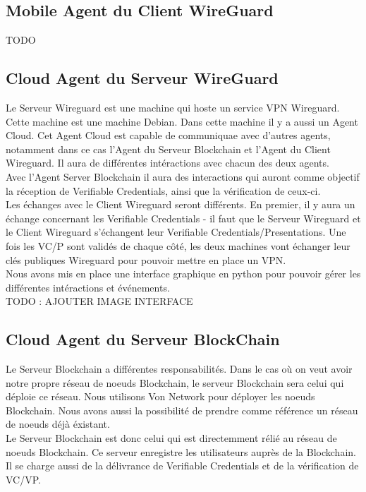 \documentclass[12pt, openany]{report}
\begin{document}
\subsection{Mobile Agent du Client WireGuard}
\noindent 
\begin{flushleft}
TODO
\end{flushleft}

\subsection{Cloud Agent du Serveur WireGuard}
\noindent 
\begin{flushleft}
Le Serveur Wireguard est une machine qui hoste un service VPN Wireguard. Cette machine est une machine Debian. Dans cette machine il y a aussi un Agent Cloud. Cet Agent Cloud est capable de communiquae avec d'autres agents, notamment dans ce cas l'Agent du Serveur Blockchain et l'Agent du Client Wireguard. Il aura de différentes intéractions avec chacun des deux agents. \\
Avec l'Agent Server Blockchain il aura des interactions qui auront comme objectif la réception de Verifiable Credentials, ainsi que la vérification de ceux-ci. \\
Les échanges avec le Client Wireguard seront différents. En premier, il y aura un échange concernant les Verifiable Credentials - il faut que le Serveur Wireguard et le Client Wireguard s'échangent leur Verifiable Credentials/Presentations. Une fois les VC/P sont validés de chaque côté, les deux machines vont échanger leur clés publiques Wireguard pour pouvoir mettre en place un VPN. \\
Nous avons mis en place une interface graphique en python pour pouvoir gérer les différentes intéractions et événements.\\
TODO : AJOUTER IMAGE INTERFACE 
\end{flushleft}

\subsection{Cloud Agent du Serveur BlockChain}
\noindent 
\begin{flushleft}
Le Serveur Blockchain a différentes responsabilités. Dans le cas où on veut avoir notre propre réseau de noeuds Blockchain, le serveur Blockchain sera celui qui déploie ce réseau. Nous utilisons Von Network pour déployer les noeuds Blockchain. Nous avons aussi la possibilité de prendre comme référence un réseau de noeuds déjà éxistant. \\
Le Serveur Blockchain est donc celui qui est directemment rélié au réseau de noeuds Blockchain. Ce serveur enregistre les utilisateurs auprès de la Blockchain. Il se charge aussi de la délivrance de Verifiable Credentials et de la vérification de VC/VP. \\

\end{flushleft}
\end{document}
